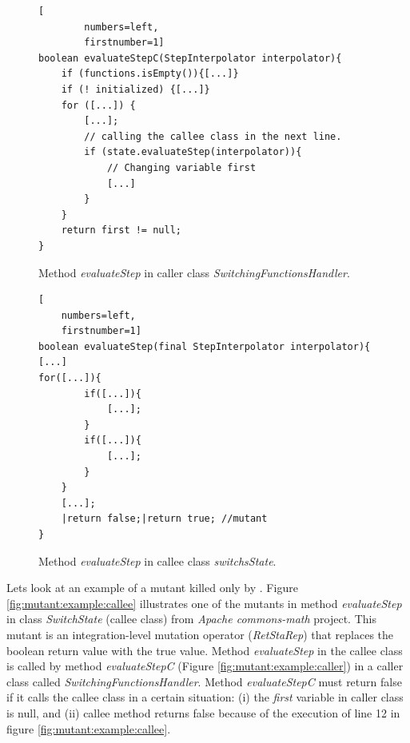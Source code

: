 \begin{figure}
    \begin{lstlisting}[
        numbers=left,
        firstnumber=1] 
boolean evaluateStepC(StepInterpolator interpolator){
    if (functions.isEmpty()){[...]}
    if (! initialized) {[...]}
    for ([...]) {
        [...];
        // calling the callee class in the next line.
        if (state.evaluateStep(interpolator)){ 
            // Changing variable first
            [...]
        }  
    }
    return first != null;
}
    \end{lstlisting}
    \caption{Method \textit{evaluateStep} in caller class \textit{SwitchingFunctionsHandler}.}
    \label{fig:mutant:example:caller}
   
    \begin{lstlisting}[
    numbers=left,
    firstnumber=1] 
boolean evaluateStep(final StepInterpolator interpolator){
[...]    
for([...]){
        if([...]){
            [...];
        }
        if([...]){
            [...];
        }
    }
    [...];
    |return false;|return true; //mutant
}
        \end{lstlisting}
        \caption{Method \textit{evaluateStep} in callee class \textit{switchsState}.}
        \label{fig:mutant:example:callee}
  \label{fig:mutant:example}
\end{figure}

Lets look at an example of a mutant killed only by \integration. Figure \ref{fig:mutant:example:callee} illustrates one of the mutants in method  \textit{evaluateStep} in class \textit{SwitchState} (callee class) from \textit{Apache commons-math} project. 
This mutant is an integration-level mutation operator (\textit{RetStaRep}) that replaces the boolean return value with the true value.
Method \textit{evaluateStep} in the callee class is called by method \textit{evaluateStepC} (Figure \ref{fig:mutant:example:caller}) in a caller class called \textit{SwitchingFunctionsHandler}. Method \textit{evaluateStepC} must return false if it calls the callee class in a certain situation: (i) the \textit{first} variable in caller class is null, and (ii) callee method returns false because of the execution of line 12 in figure \ref{fig:mutant:example:callee}. 


